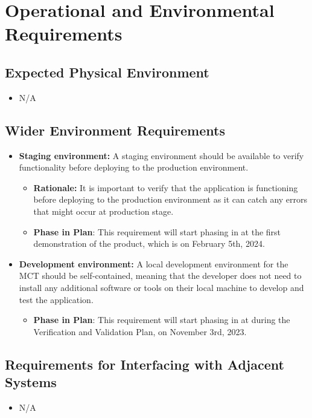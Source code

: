 \documentclass[12pt]{article}
\begin{document}
\section{Operational and Environmental Requirements}
\subsection{Expected Physical Environment}
\begin{itemize}
    \item N/A
\end{itemize}
\subsection{Wider Environment Requirements}

\begin{itemize}
    \item \textbf{Staging environment:} A staging environment should be available to verify functionality before deploying to the production environment.
    \begin{itemize}
        \item \textbf{Rationale: }It is important to verify that the application is functioning before deploying to the production environment as it can catch any errors that might occur at production stage.
        \item \textbf{Phase in Plan}: This requirement will start phasing in at the first demonstration of the product, which is on February 5th, 2024.
    \end{itemize}
    \item \textbf{Development environment:} A local development environment for the MCT should be self-contained, meaning that the developer does not need to install any additional software or tools on their local machine to develop and test the application.
    \begin{itemize}
        \item \textbf{Phase in Plan}: This requirement will start phasing in at during the Verification and Validation Plan, on November 3rd, 2023.
    \end{itemize}
\end{itemize}


\subsection{Requirements for Interfacing with Adjacent Systems}
\begin{itemize}
    \item N/A
\end{itemize}
\end{document}
